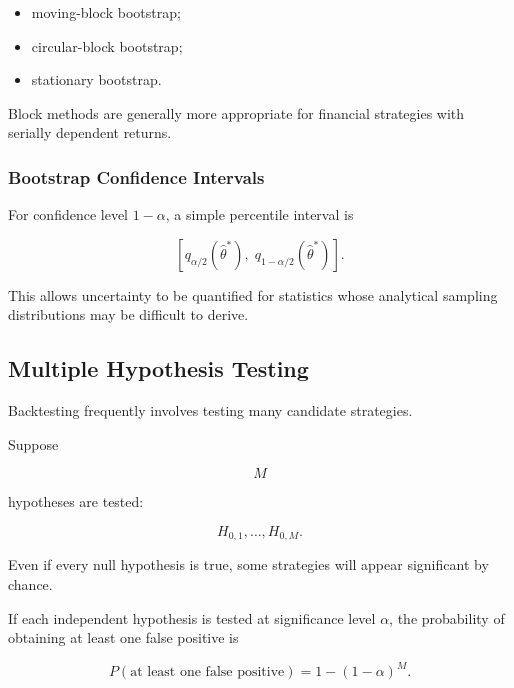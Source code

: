 \documentclass[11pt,a4paper]{article}
\begin{document}
\begin{itemize}
    \item moving-block bootstrap;
    \item circular-block bootstrap;
    \item stationary bootstrap.
\end{itemize}

Block methods are generally more appropriate for financial strategies with
serially dependent returns.


\subsubsection{Bootstrap Confidence Intervals}

For confidence level $1-\alpha$, a simple percentile interval is

\begin{equation}
\boxed{
\left[
q_{\alpha/2}
\left(
\widehat{\theta}^{*}
\right),
\;
q_{1-\alpha/2}
\left(
\widehat{\theta}^{*}
\right)
\right].
}
\end{equation}

This allows uncertainty to be quantified for statistics whose analytical
sampling distributions may be difficult to derive.


\subsection{Multiple Hypothesis Testing}
\label{subsec:multiple_hypothesis_testing}

Backtesting frequently involves testing many candidate strategies.

Suppose

\begin{equation}
M
\end{equation}

hypotheses are tested:

\begin{equation}
H_{0,1},
\ldots,
H_{0,M}.
\end{equation}

Even if every null hypothesis is true, some strategies will appear significant
by chance.

If each independent hypothesis is tested at significance level $\alpha$, the
probability of obtaining at least one false positive is

\begin{equation}
\boxed{
P(\text{at least one false positive})
=
1-(1-\alpha)^M.
}
\end{equation}
\end{document}
